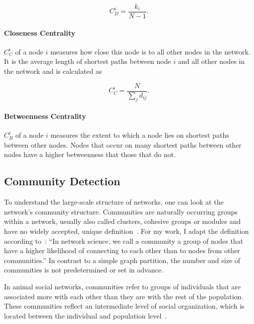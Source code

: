 \begin{equation}
\label{eq:degrC}
C^i_D=\frac{k_i}{N-1}.
\end{equation}

\paragraph{Closeness Centrality}
$C^i_C$ of a node $i$ measures how close this node is to all other nodes in the network. 
It is the average length of shortest paths between node $i$ and all other nodes in the network and is calculated as

\begin{equation}
\label{eq:cc}
C_C^i=\frac{N}{\sum_{j}d_{ij}}.
\end{equation}

\paragraph{Betweenness Centrality}
$C^i_B$ of a node $i$ measures the extent to which a node lies on shortest paths between other nodes. Nodes that occur on many shortest paths between other nodes have a higher betweenness that those that do not.


\subsection{Community Detection}
\label{subsec:bg:communities}
To understand the large-scale structure of networks, one can look at the network's community structure. Communities are naturally occurring groups within a network, usually also called clusters, cohesive groups or modules and have no widely accepted, unique definition~\cite{palla2005uncovering}.
For my work, I adapt the definition according to~\textcite[p. 322]{barabasi2016network}: 
``In network science, we call a community a group of nodes that have a higher likelihood of connecting to each other than to nodes from other communities.'' In contrast to a simple graph partition, the number and size of communities is not predetermined or set in advance.

In animal social networks, communities refer to groups of individuals that are associated more with each other than they are with the rest of the population. These communities reflect an intermediate level of social organization, which is located between the individual and population level~\cite{croft2008exploring}.

